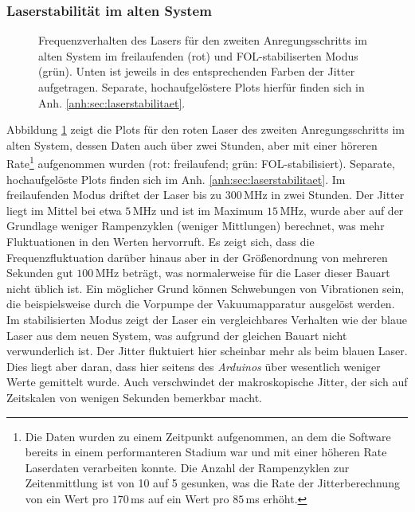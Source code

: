 \subsubsection{Laserstabilität im alten
System}\label{subsubsec:stabilitaetsmessungen_software_altes_system}
\begin{figure}[h]
 	\centering
 	\footnotesize
	
	\caption[Laserfrequenzverhalten altes System]{Frequenzverhalten des Lasers für
	den zweiten Anregungsschritts im alten System im freilaufenden (rot) und
	FOL-stabiliserten Modus (grün). Unten ist jeweils in des entsprechenden Farben
	der Jitter aufgetragen. Separate, hochaufgelöstere Plots hierfür finden sich in
	Anh. \ref{anh:sec:laserstabilitaet}.}
	\label{fig:laserstabilitaet_alt_alles}
\end{figure}
Abbildung \ref{fig:laserstabilitaet_alt_alles} zeigt die Plots für den
roten Laser des zweiten Anregungsschritts im alten System, dessen Daten auch
über zwei Stunden, aber mit einer höreren Rate\footnote{Die Daten wurden zu
einem Zeitpunkt aufgenommen, an dem die Software bereits in einem performanteren
Stadium war und mit einer höheren Rate Laserdaten verarbeiten konnte. Die Anzahl
der Rampenzyklen zur Zeitenmittlung ist von 10 auf 5 gesunken, was die Rate
der Jitterberechnung von ein Wert pro $170\,$ms auf ein Wert pro $85\,$ms
erhöht.} aufgenommen wurden (rot:
freilaufend; grün:
FOL-stabilisiert).
Separate, hochaufgelöste Plots finden sich im Anh.
\ref{anh:sec:laserstabilitaet}. Im freilaufenden Modus driftet der Laser bis
zu $300\,$MHz in zwei Stunden. Der Jitter liegt im Mittel bei etwa $5\,$MHz und
ist im Maximum $15\,$MHz, wurde aber auf der Grundlage weniger Rampenzyklen
(weniger Mittlungen) berechnet, was mehr Fluktuationen in den Werten hervorruft.
Es zeigt sich, dass die Frequenzfluktuation darüber hinaus aber in der Größenordnung von mehreren Sekunden gut $100\,$MHz beträgt, was normalerweise für die Laser dieser Bauart
nicht üblich ist. Ein möglicher Grund können Schwebungen von Vibrationen sein,
die beispielsweise durch die Vorpumpe der Vakuumapparatur ausgelöst werden. Im
stabilisierten Modus zeigt der Laser ein vergleichbares Verhalten wie der blaue
Laser aus dem neuen System, was aufgrund der gleichen Bauart nicht verwunderlich ist. Der Jitter fluktuiert hier scheinbar mehr als beim blauen
Laser. Dies liegt aber daran, dass hier seitens des \textit{Arduinos} über
wesentlich weniger Werte gemittelt wurde. Auch verschwindet der makroskopische
Jitter, der sich auf Zeitskalen von wenigen Sekunden bemerkbar macht.\par
